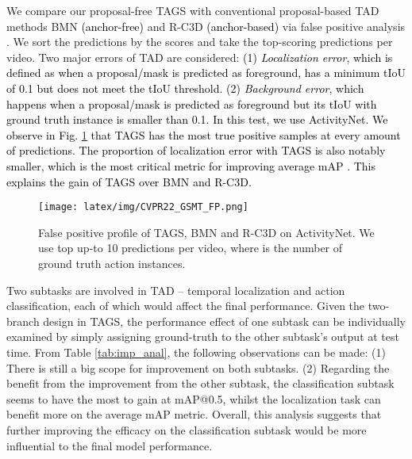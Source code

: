 \documentclass[runningheads]{llncs}
\newcommand{\shortmodelname}{TAGS}
\begin{document}
We compare our proposal-free {\shortmodelname} with conventional proposal-based TAD methods BMN \cite{bai2020boundary} \textcolor{black}{(anchor-free)} and R-C3D \cite{xu2017r} \textcolor{black}{(anchor-based)} via false positive analysis \cite{alwassel2018diagnosing}. We sort the predictions by the scores and take the top-scoring predictions per video. Two major errors of TAD are considered:
\textcolor{black}{(1) {\em Localization error}, which is defined as when a proposal/mask is predicted as foreground, has a minimum tIoU of 0.1 but does not meet the tIoU threshold. 
(2) {\em Background error}, which happens when a proposal/mask
is predicted as foreground but its tIoU with ground truth instance is smaller than 0.1.
In this test, we use ActivityNet. 
\textcolor{black}{We observe in Fig. \ref{fig:error_prof} that {\shortmodelname} has the most true positive samples at every
amount of predictions. The proportion of localization error
with {\shortmodelname} is also notably smaller,
which is the most critical metric for improving average mAP \cite{alwassel2018diagnosing}.
This explains the gain of {\shortmodelname} over BMN and R-C3D.
}
}
\begin{figure}[h]
    \centering
    \texttt{[image: latex/img/CVPR22\_GSMT\_FP.png]}
\caption{False positive profile of {\shortmodelname}, BMN and R-C3D on ActivityNet.
  We use top up-to 10 predictions per video, where  is the number of ground truth action instances.}
    \label{fig:error_prof}
\end{figure}




Two subtasks are involved in TAD -- temporal localization and action classification, each of which would affect the final performance. 
Given the two-branch design in {\shortmodelname},
the performance effect of one subtask can be individually examined
by simply assigning ground-truth to the other subtask's output at test time.
From Table \ref{tab:imp_anal}, the following observations can be made:
(1) There is still a big scope for improvement  on both subtasks.
(2) Regarding the benefit from the improvement from the other subtask, the classification subtask seems to have the most to gain at mAP@0.5, 
whilst the localization task  can benefit more on the average mAP metric.
Overall, this analysis suggests that further improving the efficacy on the classification subtask would be more influential to the final model performance. 
\end{document}
